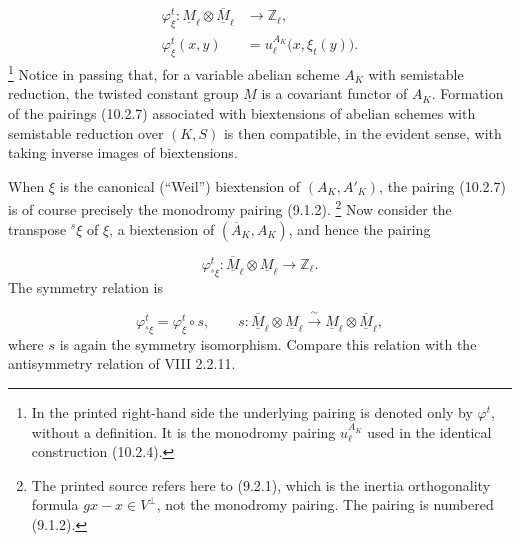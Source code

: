 \begin{equation}\tag{10.2.7}
\begin{aligned}
\varphi^t_\xi:\underline M_\ell\otimes
 \overline{\underline M}_\ell&\longrightarrow\mathbb Z_\ell,\\
\varphi^t_\xi(x,y)&=u_\ell^{A_K}\bigl(x,\xi_t(y)\bigr).
\end{aligned}
\end{equation}
\footnote{In the printed right-hand side the underlying pairing is denoted
only by $\varphi^t$, without a definition. It is the monodromy pairing
$u_\ell^{A_K}$ used in the identical construction (10.2.4).}
Notice in passing that, for a variable abelian scheme $A_K$ with semistable
reduction, the twisted constant group $\underline M$ is a covariant
functor of $A_K$. Formation of the pairings (10.2.7) associated with
biextensions of abelian schemes with semistable reduction over $(K,S)$ is
then compatible, in the evident sense, with taking inverse images of
biextensions.

When $\xi$ is the canonical (``Weil'') biextension of $(A_K,A'_K)$, the
pairing (10.2.7) is of course precisely the monodromy pairing (9.1.2).
\footnote{The printed source refers here to (9.2.1), which is the inertia
orthogonality formula $gx-x\in V^\perp$, not the monodromy pairing. The
pairing is numbered (9.1.2).}
Now consider the transpose ${}^s\xi$ of $\xi$, a biextension of
$(\overline A_K,A_K)$, and hence the pairing

\begin{equation*}
\varphi^t_{{}^s\xi}:\overline{\underline M}_\ell\otimes
 \underline M_\ell\longrightarrow\mathbb Z_\ell.
\end{equation*}
The symmetry relation is

\begin{equation}\tag{10.2.8}
\varphi^t_{{}^s\xi}=\varphi^t_\xi\circ s,
\qquad
s:\overline{\underline M}_\ell\otimes\underline M_\ell
 \xrightarrow{\ \sim\ }
 \underline M_\ell\otimes\overline{\underline M}_\ell,
\end{equation}
where $s$ is again the symmetry isomorphism. Compare this relation with
the antisymmetry relation of VIII 2.2.11.

